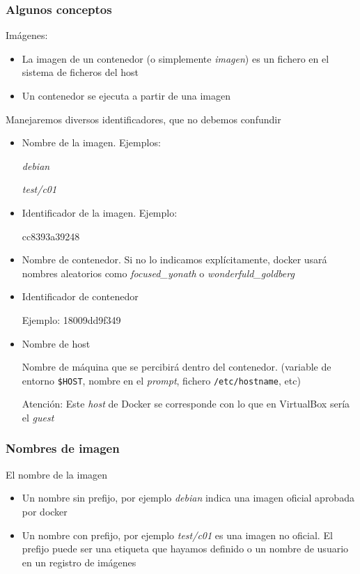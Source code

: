 \documentclass[ucs]{beamer}
\begin{document}
\begin{frame}[fragile]
\frametitle{Algunos conceptos}
Imágenes:
\begin{itemize}
\item
La imagen de un contenedor (o simplemente \emph{imagen})
es un fichero en el sistema de ficheros del host

\item
Un contenedor se ejecuta a partir de una imagen
\end{itemize}

\end{frame}
\begin{frame}[fragile]


Manejaremos diversos identificadores, que no debemos confundir


\begin{itemize}
\item
Nombre de la imagen. 
Ejemplos:  

\emph{debian} 

\emph{test/c01} 

\item
Identificador de la imagen. Ejemplo:

cc8393a39248

\item
Nombre de contenedor. Si no lo indicamos explícitamente,
docker usará nombres aleatorios como \emph{focused\_yonath} 
o
\emph{wonderfuld\_goldberg}

\item
Identificador de contenedor

Ejemplo:
18009dd9f349

\item
Nombre de host

Nombre de máquina que se percibirá dentro del contenedor. (variable
de entorno \verb|$HOST|, nombre en el 
\emph{prompt},
fichero
\verb|/etc/hostname|, etc)

Atención: Este \emph{host} de Docker se corresponde con lo que en VirtualBox 
sería el \emph{guest}

\end{itemize}


\end{frame}
\begin{frame}[fragile]

\frametitle{Nombres de imagen}


El nombre de la imagen


\begin{itemize}
\item
Un nombre sin prefijo, por ejemplo
\emph{debian} 
indica una imagen oficial
aprobada por docker

\item
Un nombre con prefijo, por ejemplo
\emph{test/c01}
es una imagen no oficial. El prefijo puede ser una etiqueta que hayamos
definido o un nombre de usuario en un registro de imágenes
\end{itemize}


\end{frame}
\end{document}
